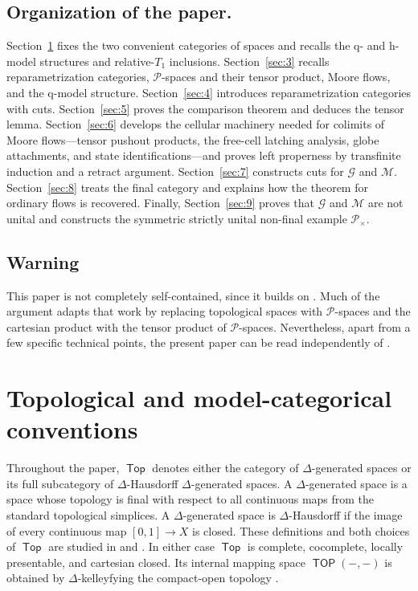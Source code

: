 \documentclass[12pt,a4paper]{amsart}
\newcommand{\Top}{\mathop{\mathsf{Top}}}
\newcommand{\TOP}{\mathop{\mathsf{TOP}}}
\newcommand{\Pcat}{\mathcal P}
\newcommand{\G}{\mathcal G}
\newcommand{\M}{\mathcal M}
\theoremstyle{definition}
\begin{document}
\subsection*{Organization of the paper.}
Section~\ref{sec:2} fixes the two convenient categories of spaces and recalls the q- and h-model structures and relative-\(T_1\) inclusions. Section~\ref{sec:3} recalls reparametrization categories, \(\Pcat\)-spaces and their tensor product, Moore flows, and the q-model structure. Section~\ref{sec:4} introduces reparametrization categories with cuts. Section~\ref{sec:5} proves the comparison theorem and deduces the tensor lemma. Section~\ref{sec:6} develops the cellular machinery needed for colimits of Moore flows---tensor pushout products, the free-cell latching analysis, globe attachments, and state identifications---and proves left properness by transfinite induction and a retract argument. Section~\ref{sec:7} constructs cuts for \(\G\) and \(\M\). Section~\ref{sec:8} treats the final category and explains how the theorem for ordinary flows is recovered. Finally, Section~\ref{sec:9} proves that \(\G\) and \(\M\) are not unital and constructs the symmetric strictly unital non-final example \(\Pcat_{\times}\).

\subsection*{Warning}

This paper is not completely self-contained, since it builds on \cite{leftproperflow}. Much of the argument adapts that work by replacing topological spaces with \(\Pcat\)-spaces and the cartesian product with the tensor product of \(\Pcat\)-spaces. Nevertheless, apart from a few specific technical points, the present paper can be read independently of \cite{leftproperflow}.

\section{Topological and model-categorical conventions}
\label{sec:2}

Throughout the paper, \(\Top\) denotes either the category of \(\Delta\)-generated spaces or its full subcategory of \(\Delta\)-Hausdorff \(\Delta\)-generated spaces.  A \(\Delta\)-generated space is a space whose topology is final with respect to all continuous maps from the standard topological simplices.  A \(\Delta\)-generated space is \(\Delta\)-Hausdorff if the image of every continuous map \([0,1]\to X\) is closed.  These definitions and both choices of \(\Top\) are studied in \cite[Section~2]{Moore1} and \cite[Section~2 and Appendix~B]{leftproperflow}.  In either case \(\Top\) is complete, cocomplete, locally presentable, and cartesian closed.  Its internal mapping space \(\TOP(-,-)\) is obtained by \(\Delta\)-kelleyfying the compact-open topology \cite[Section~2, pp.~3--4]{Moore1}.
\end{document}
